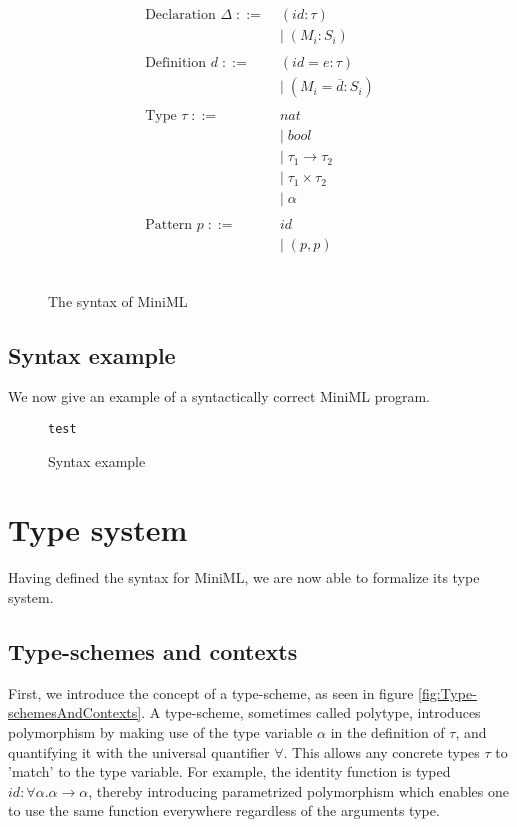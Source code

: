 \documentclass[10pt,a4paper,draft]{article}
\begin{document}
\begin{flushleft}
\begin{figure}[!htbp]
\begin{align*}
\begin{aligned}
\\
\text{Declaration } \Delta \; ::=\; & (\mathit{id}:\tau)\\
& | \; (\mathit{M_{i}}:S_{i})\\
\\
\text{Definition } d \; ::= \; &(\mathit{id}=e:\tau)\\
& | \; (\mathit{M_{i}} = \overline{d} : S_{i}) \\
\\
\text{Type }\tau \; ::= \; &nat \\
&| \; \mathit{bool} \\
&| \; \tau_{1} \rightarrow \tau_{2} \\
&| \; \tau_{1} \times \tau_{2} \\
&| \; \alpha\\
\\
\text{Pattern }p \; ::= \; & \mathit{id} \\
&| \; (p,p)\\
\\
\\
\end{aligned}
\end{align*}
\caption{The syntax of MiniML}
\label{fig:Syntax}
\end{figure}

\subsection{Syntax example}
We now give an example of a syntactically correct MiniML program.

\begin{figure}[!htbp]
\begin{verbatim}
test
\end{verbatim}
\caption{Syntax example}
\label{code:SyntaxExample}
\end{figure}

\section{Type system}
Having defined the syntax for MiniML, we are now able to formalize its type system.

\subsection{Type-schemes and contexts}
First, we introduce the concept of a type-scheme, as seen in figure \ref{fig:Type-schemesAndContexts}. A type-scheme, sometimes called polytype, introduces polymorphism by making use of the type variable $\alpha$ in the definition of $\tau$, and quantifying it with the universal quantifier $\forall$. This allows any concrete types $\tau$ to 'match' to the type variable. For example, the identity function  is typed $id:\forall \alpha. \alpha \rightarrow \alpha$, thereby introducing parametrized polymorphism which enables one to use the same  function everywhere regardless of the arguments type.


\end{flushleft}
\end{document}
